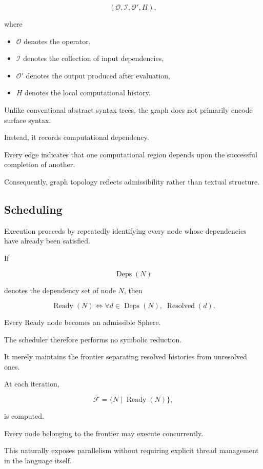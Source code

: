 \documentclass[12pt,oneside]{article}
\theoremstyle{definition}
\theoremstyle{remark}
\begin{document}
\[
(\mathcal O,\mathcal I,\mathcal O',H),
\]

where

\begin{itemize}
\item $\mathcal O$ denotes the operator,
\item $\mathcal I$ denotes the collection of input dependencies,
\item $\mathcal O'$ denotes the output produced after evaluation,
\item $H$ denotes the local computational history.
\end{itemize}

Unlike conventional abstract syntax trees, the graph does not primarily encode
surface syntax.

Instead, it records computational dependency.

Every edge indicates that one computational region depends upon the successful
completion of another.

Consequently, graph topology reflects admissibility rather than textual
structure.

\subsection{Scheduling}

Execution proceeds by repeatedly identifying every node whose dependencies have
already been satisfied.

If

\[
\operatorname{Deps}(N)
\]

denotes the dependency set of node \(N\), then

\[
\operatorname{Ready}(N)
\Longleftrightarrow
\forall
d\in
\operatorname{Deps}(N),
\;
\operatorname{Resolved}(d).
\]

Every Ready node becomes an admissible Sphere.

The scheduler therefore performs no symbolic reduction.

It merely maintains the frontier separating resolved histories from unresolved
ones.

At each iteration,

\[
\mathcal F
=
\{
N
\mid
\operatorname{Ready}(N)
\},
\]

is computed.

Every node belonging to the frontier may execute concurrently.

This naturally exposes parallelism without requiring explicit thread
management in the language itself.
\end{document}
